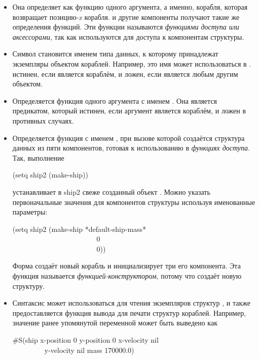 \begin{itemize}

\item Она определяет  как функцию одного
  аргумента, а именно, корабля, которая возвращает позицию-\emph{x}
  корабля.   и другие компоненты получают такие
  же определения функций.  Эти функции называются \emph{функциями
    доступа или аксессорами}, так как используются для доступа к
  компонентам структуры.

\item Символ  становится именем типа данных, к которому
  принадлежат экземпляры объектом кораблей. Например, это имя может
  использоваться в .   истинен, если
   является кораблём, и ложен, если  является любым
  другим объектом.

\item Определяется функция одного аргумента с именем . Она
  является предикатом, который истинен, если аргумент является
  кораблём, и ложен в противных случаях.

\item Определяется функция с именем , при вызове
  которой создаётся структура данных из пяти компонентов, готовая к
  использованию в \emph{функциях доступа}.  Так, выполнение
  \begin{lisp}
    (setq ship2 (make-ship))
  \end{lisp}
  устанавливает в ship2 свеже созданный объект .  Можно
  указать первоначальные значения для компонентов структуры используя
  именованные параметры:
  \begin{lisp}
    (setq ship2 (make-ship  *default-ship-mass* \\
    ~~~~~~~~~~~~~~~~~~~~~~~ 0 \\
    ~~~~~~~~~~~~~~~~~~~~~~~ 0))
  \end{lisp}
  Форма создаёт новый корабль и инициализирует три его компонента.
  Эта функция называется \emph{функцией-конструктором}, потому что
  создаёт новую структуру.

\item Синтаксис  может использоваться для чтения экземпляров
  структур , и также предоставляется функция вывода для
  печати структур кораблей.  Например, значение ранее упомянутой
  переменной  может быть выведено как
  \begin{lisp}
    \#S(ship  x-position 0  y-position 0  x-velocity nil \\
    ~~~~~~~~~y-velocity nil mass 170000.0)
  \end{lisp}


\end{itemize}
